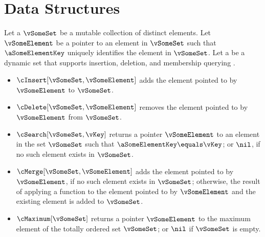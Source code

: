 \chapter{Data Structures}\label{ch:data-structures}

Let a  $\vSomeSet$ be a mutable collection of distinct elements. Let $\vSomeElement$ be a pointer to an element in $\vSomeSet$ such that $\aSomeElementKey$ uniquely identifies the element in $\vSomeSet$. Let a  be a dynamic set that supports insertion, deletion, and membership querying \citep{Cormen2022}.
%
\begin{itemize}
  \item $\cInsert[\vSomeSet, \vSomeElement]$ adds the element pointed to by $\vSomeElement$ to $\vSomeSet$.
  \item $\cDelete[\vSomeSet, \vSomeElement]$ removes the element pointed to by $\vSomeElement$ from $\vSomeSet$.
  \item $\cSearch[\vSomeSet, \vKey]$ returns a pointer $\vSomeElement$ to an element in the set $\vSomeSet$ such that $\aSomeElementKey \equals \vKey$; or $\nil$, if no such element exists in $\vSomeSet$.
  \item $\cMerge[\vSomeSet, \vSomeElement]$ adds the element pointed to by $\vSomeElement$, if no such element exists in $\vSomeSet$; otherwise, the result of applying a function to the element pointed to by $\vSomeElement$ and the existing element is added to $\vSomeSet$.
  \item $\cMaximum[\vSomeSet]$ returns a pointer $\vSomeElement$ to the maximum element of the totally ordered set $\vSomeSet$; or $\nil$ if $\vSomeSet$ is empty.
\end{itemize}